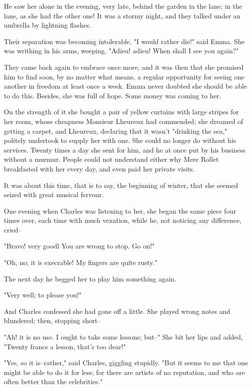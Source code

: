 \documentclass[11pt,twocolumn]{ltugboat}
\begin{document}
He saw her alone in the evening, very late, behind the garden in the
lane; in the lane, as she had the other one! It was a stormy night, and
they talked under an umbrella by lightning flashes.

Their separation was becoming intolerable. "I would rather die!" said
Emma. She was writhing in his arms, weeping. "Adieu! adieu! When shall I
see you again?"

They came back again to embrace once more, and it was then that
she promised him to find soon, by no matter what means, a regular
opportunity for seeing one another in freedom at least once a week. Emma
never doubted she should be able to do this. Besides, she was full of
hope. Some money was coming to her.

On the strength of it she bought a pair of yellow curtains with large
stripes for her room, whose cheapness Monsieur Lheureux had commended;
she dreamed of getting a carpet, and Lheureux, declaring that it wasn't
"drinking the sea," politely undertook to supply her with one. She could
no longer do without his services. Twenty times a day she sent for him,
and he at once put by his business without a murmur. People could not
understand either why Mere Rollet breakfasted with her every day, and
even paid her private visits.

It was about this time, that is to say, the beginning of winter, that
she seemed seized with great musical fervour.

One evening when Charles was listening to her, she began the same piece
four times over, each time with much vexation, while he, not noticing
any difference, cried--

"Bravo! very goodl You are wrong to stop. Go on!"

"Oh, no; it is execrable! My fingers are quite rusty."

The next day he begged her to play him something again.

"Very well; to please you!"

And Charles confessed she had gone off a little. She played wrong notes
and blundered; then, stopping short--

"Ah! it is no use. I ought to take some lessons; but--" She bit her lips
and added, "Twenty francs a lesson, that's too dear!"

"Yes, so it is--rather," said Charles, giggling stupidly. "But it seems
to me that one might be able to do it for less; for there are artists of
no reputation, and who are often better than the celebrities."
\end{document}
